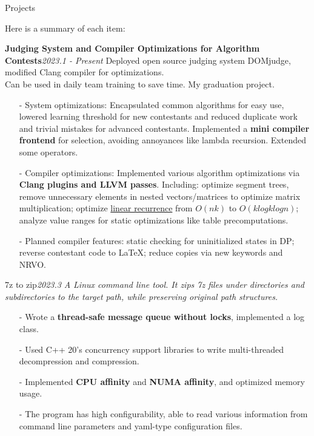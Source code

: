 \documentclass{resume} %
\begin{document}
\begin{rSection}{Projects}

Here is a summary of each item:

\begin{rSubsection}
{\textbf{Judging System and Compiler Optimizations for Algorithm Contests}}{\em 2023.1 - Present} 
{Deployed open source judging system DOMjudge, modified Clang compiler for optimizations.\\}
{Can be used in daily team training to save time. My graduation project.}
\item[]
\begin{itemize}
    \setlength\itemsep{-0.5em}
    \item[-] System optimizations: Encapsulated common algorithms for easy use, lowered learning threshold for new contestants and reduced duplicate work and trivial mistakes for advanced contestants. Implemented a \textbf{mini compiler frontend} for selection, avoiding annoyances like lambda recursion. Extended some operators.  
    \item[-] Compiler optimizations: Implemented various algorithm optimizations via \textbf{Clang plugins and LLVM passes}. Including: optimize segment trees, remove unnecessary elements in nested vectors/matrices to optimize matrix multiplication; optimize \href{https://oi-wiki.org/math/poly/linear-recurrence/}{linear recurrence} from $O(nk)$ to $O(klogklogn)$; analyze value ranges for static optimizations like table precomputations.
    \item[-] Planned compiler features: static checking for uninitialized states in DP; reverse contestant code to \LaTeX; reduce copies via new keywords and NRVO.
\end{itemize}
\end{rSubsection}

\begin{rSubsection}
{7z to zip}{\em 2023.3}
{\textit{A Linux command line tool. It zips 7z files under directories and subdirectories to the target path, while preserving original path structures.} \\}
{}
\item[]  
\begin{itemize}
    \setlength\itemsep{-0.5em} 
    \item[-] Wrote a \textbf{thread-safe message queue without locks}, implemented a log class.
    \item[-] Used C++ 20's concurrency support libraries to write multi-threaded decompression and compression.
    \item[-] Implemented \textbf{CPU affinity} and \textbf{NUMA affinity}, and optimized memory usage. 
    \item[-] The program has high configurability, able to read various information from command line parameters and yaml-type configuration files.
\end{itemize}
\end{rSubsection}



\end{rSection}
\end{document}

